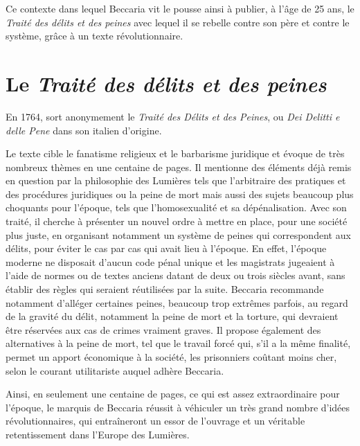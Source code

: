 Ce contexte dans lequel Beccaria vit le pousse ainsi à publier, à l'âge de 25 ans, le \emph{Traité des délits et des peines} avec lequel il se rebelle contre son père et contre le système, grâce à un texte révolutionnaire.

\section{Le \emph{Traité des délits et des peines}}
En 1764, sort anonymement le \emph{Traité des Délits et des Peines}, ou \emph{Dei Delitti e delle Pene} dans son italien d'origine.

Le texte cible le fanatisme religieux et le barbarisme juridique et évoque de très nombreux thèmes en une centaine de pages. Il mentionne des éléments déjà remis en question par la philosophie des Lumières tels que l'arbitraire des pratiques et des procédures juridiques ou la peine de mort mais aussi des sujets beaucoup plus choquants  pour l'époque, tels que l'homosexualité et sa dépénalisation. Avec son traité, il cherche à présenter un nouvel ordre à mettre en place, pour une société plus juste, en organisant notamment un système de peines qui correspondent aux délits, pour éviter le cas par cas qui avait lieu à l'époque. En effet, l'époque moderne ne disposait d'aucun code pénal unique et les magistrats jugeaient à l'aide de normes ou de textes anciens datant de deux ou trois siècles avant, sans établir des règles qui seraient réutilisées par la suite. Beccaria recommande notamment d'alléger certaines peines, beaucoup trop extrêmes parfois, au regard de la gravité du délit, notamment la peine de mort et la torture, qui devraient être réservées aux cas de crimes vraiment graves. Il propose également des alternatives à la peine de mort, tel que le travail forcé qui, s'il a la même finalité, permet un apport économique à la société, les prisonniers coûtant moins cher, selon le courant utilitariste auquel adhère Beccaria.

Ainsi, en seulement une centaine de pages, ce qui est assez extraordinaire pour l'époque, le marquis de Beccaria réussit à véhiculer un très grand nombre d'idées révolutionnaires, qui entraîneront un essor de l'ouvrage et un véritable retentissement dans l'Europe des Lumières.

